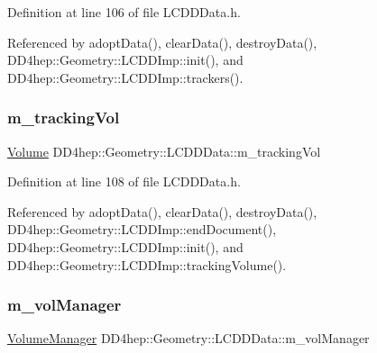 Definition at line 106 of file L\+C\+D\+D\+Data.\+h.



Referenced by adopt\+Data(), clear\+Data(), destroy\+Data(), D\+D4hep\+::\+Geometry\+::\+L\+C\+D\+D\+Imp\+::init(), and D\+D4hep\+::\+Geometry\+::\+L\+C\+D\+D\+Imp\+::trackers().

\hypertarget{class_d_d4hep_1_1_geometry_1_1_l_c_d_d_data_a05d9a2147427574904e80936b009d5ec}{}\label{class_d_d4hep_1_1_geometry_1_1_l_c_d_d_data_a05d9a2147427574904e80936b009d5ec} 
\subsubsection{\texorpdfstring{m\+\_\+tracking\+Vol}{m\_trackingVol}}
{\footnotesize\ttfamily \hyperlink{class_d_d4hep_1_1_geometry_1_1_volume}{Volume} D\+D4hep\+::\+Geometry\+::\+L\+C\+D\+D\+Data\+::m\+\_\+tracking\+Vol\hspace{0.3cm}{\ttfamily [protected]}}



Definition at line 108 of file L\+C\+D\+D\+Data.\+h.



Referenced by adopt\+Data(), clear\+Data(), destroy\+Data(), D\+D4hep\+::\+Geometry\+::\+L\+C\+D\+D\+Imp\+::end\+Document(), D\+D4hep\+::\+Geometry\+::\+L\+C\+D\+D\+Imp\+::init(), and D\+D4hep\+::\+Geometry\+::\+L\+C\+D\+D\+Imp\+::tracking\+Volume().

\hypertarget{class_d_d4hep_1_1_geometry_1_1_l_c_d_d_data_a8a01d0ac487c537e9826d2900c95062a}{}\label{class_d_d4hep_1_1_geometry_1_1_l_c_d_d_data_a8a01d0ac487c537e9826d2900c95062a} 
\subsubsection{\texorpdfstring{m\+\_\+vol\+Manager}{m\_volManager}}
{\footnotesize\ttfamily \hyperlink{class_d_d4hep_1_1_geometry_1_1_volume_manager}{Volume\+Manager} D\+D4hep\+::\+Geometry\+::\+L\+C\+D\+D\+Data\+::m\+\_\+vol\+Manager\hspace{0.3cm}{\ttfamily [protected]}}



